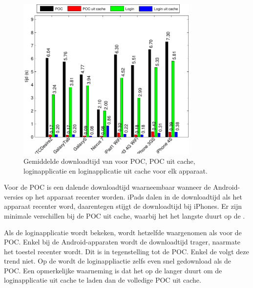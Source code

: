\begin{figure}
  \centering
  \includegraphics[width=0.8\textwidth]{figuren/performance-jquery.pdf}
  \caption{Gemiddelde downloadtijd van \jqm{} voor POC,  POC uit cache, loginapplicatie en loginapplicatie uit cache voor elk apparaat.}
  \label{fig:performantie-jqm}
\end{figure}

Voor de POC is een dalende downloadtijd waarneembaar wanneer de Android-versies op het apparaat recenter worden.
iPads dalen in de downloadtijd als het apparaat recenter word, daarentegen stijgt de downloadtijd bij iPhones.
Er zijn minimale verschillen bij de POC uit cache, waarbij het het langste duurt op de \iphoneiv{}.

Als de loginapplicatie wordt bekeken, wordt hetzelfde waargenomen als voor de POC.
Enkel bij de Android-apparaten wordt de downloadtijd trager, naarmate het toestel recenter wordt. 
Dit is in tegenstelling tot de POC.
Enkel de \nexus{} volgt deze trend niet.
Op de \nexus{} wordt de loginappliactie zelfs even snel gedownload als de POC.
Een opmerkelijke waarneming is dat het op de \nexus{} langer duurt om de loginapplicatie uit cache te laden dan de volledige POC uit cache.


\section{\lungo}
\label{app:performantie-lungo}

